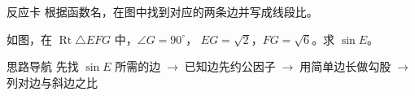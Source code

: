 \documentclass{exam-zh}
\begin{document}
\begin{eduSubQuestionItem}{反应卡}
根据函数名，在图中找到对应的两条边并写成线段比。\end{eduSubQuestionItem}

\begin{eduDualExplain}
  \begin{eduExplainLeft}
  \end{eduExplainLeft}

  \begin{eduExplainRight}
  \end{eduExplainRight}
\end{eduDualExplain}




\begin{eduProblemBlock}[例题]
\noindent
\begin{minipage}[t]{\dimexpr\linewidth-70mm-6mm\relax}
\vspace{0pt}
如图，在 $\operatorname{Rt}\triangle EFG$ 中，$\angle G=90^\circ$，
$EG=\sqrt2$，$FG=\sqrt6$。求 $\sin E$。

\end{minipage}\hfill
\begin{diagramcoltikz}{70mm}{先找 $\sin E$ 所需的对边和斜边，再观察已知边的公因子。}
}
\end{diagramcoltikz}
\end{eduProblemBlock}





\begin{eduAuxItem}{思路导航}
先找 $\sin E$ 所需的边$\;\to\;$已知边先约公因子$\;\to\;$用简单边长做勾股$\;\to\;$列对边与斜边之比\end{eduAuxItem}
\end{document}
